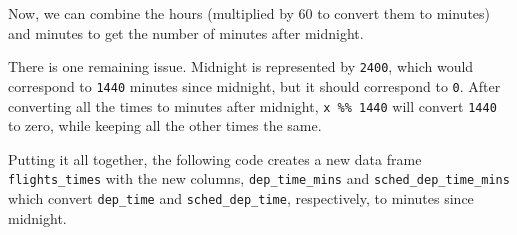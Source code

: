 \documentclass[]{book}
\newenvironment{Shaded}{\begin{snugshade}}{\end{snugshade}}
\newcommand{\CommentTok}[1]{\textcolor[rgb]{0.56,0.35,0.01}{\textit{#1}}}
\newcommand{\DataTypeTok}[1]{\textcolor[rgb]{0.13,0.29,0.53}{#1}}
\newcommand{\DecValTok}[1]{\textcolor[rgb]{0.00,0.00,0.81}{#1}}
\newcommand{\KeywordTok}[1]{\textcolor[rgb]{0.13,0.29,0.53}{\textbf{#1}}}
\newcommand{\NormalTok}[1]{#1}
\newcommand{\OperatorTok}[1]{\textcolor[rgb]{0.81,0.36,0.00}{\textbf{#1}}}
\newcommand{\StringTok}[1]{\textcolor[rgb]{0.31,0.60,0.02}{#1}}
\theoremstyle{plain}
\theoremstyle{remark}
\begin{document}
Now, we can combine the hours (multiplied by 60 to convert them to minutes) and
minutes to get the number of minutes after midnight.

\begin{Shaded}
\end{Shaded}

There is one remaining issue. Midnight is represented by \texttt{2400}, which would
correspond to \texttt{1440} minutes since midnight, but it should correspond to \texttt{0}.
After converting all the times to minutes after midnight, \texttt{x\ \%\%\ 1440} will convert
\texttt{1440} to zero, while keeping all the other times the same.

Putting it all together, the following code creates a new data frame \texttt{flights\_times}
with the new columns, \texttt{dep\_time\_mins} and \texttt{sched\_dep\_time\_mins} which convert
\texttt{dep\_time} and \texttt{sched\_dep\_time}, respectively, to minutes since midnight.

\begin{Shaded}
\end{Shaded}
\end{document}
